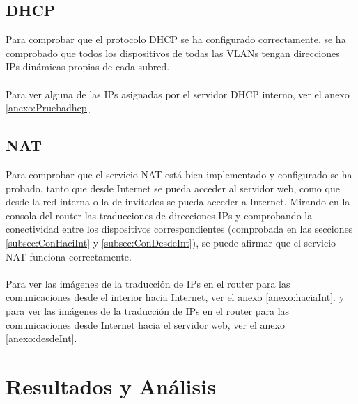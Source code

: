 \subsection{DHCP}
Para comprobar que el protocolo DHCP se ha configurado correctamente, se ha comprobado que todos los dispositivos de todas las VLANs tengan direcciones IPs dinámicas propias de cada subred.
\\ \\
Para ver alguna de las IPs asignadas por el servidor DHCP interno, ver el anexo \ref{anexo:Pruebadhcp}.
\subsection{NAT}
Para comprobar que el servicio NAT está bien implementado y configurado se ha probado, tanto que desde Internet se pueda acceder al servidor web, como que desde la red interna o la de invitados se pueda acceder a Internet.
Mirando en la consola del router las traducciones de direcciones IPs y comprobando la conectividad entre los dispositivos correspondientes (comprobada en las secciones \ref{subsec:ConHaciInt} y \ref{subsec:ConDesdeInt}), se puede afirmar que el servicio NAT funciona correctamente.
\\ \\
Para ver las imágenes de la traducción de IPs en el router para las comunicaciones desde el interior hacia Internet, ver el anexo \ref{anexo:haciaInt}. y para ver las imágenes de la traducción de IPs 
en el router para las comunicaciones desde Internet hacia el servidor web, ver el anexo \ref{anexo:desdeInt}.

\section{Resultados y Análisis}
